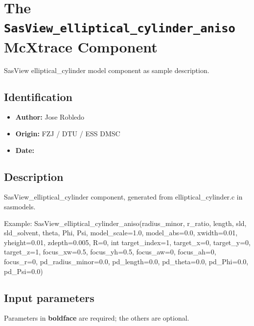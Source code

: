 \section{The \texttt{SasView\_elliptical\_cylinder\_aniso} McXtrace Component}
SasView elliptical\_cylinder model component as sample description.

\subsection*{Identification}
\begin{itemize}
  \item \textbf{Author:} Jose Robledo
  \item \textbf{Origin:} FZJ / DTU / ESS DMSC
  \item \textbf{Date:} 
\end{itemize}

\subsection*{Description}
SasView\_elliptical\_cylinder component, generated from elliptical\_cylinder.c in sasmodels.

Example: SasView\_elliptical\_cylinder\_aniso(radius\_minor, r\_ratio, length, sld, sld\_solvent, theta, Phi, Psi, model\_scale=1.0, model\_abs=0.0, xwidth=0.01, yheight=0.01, zdepth=0.005, R=0, int target\_index=1, target\_x=0, target\_y=0, target\_z=1, focus\_xw=0.5, focus\_yh=0.5, focus\_aw=0, focus\_ah=0, focus\_r=0, pd\_radius\_minor=0.0, pd\_length=0.0, pd\_theta=0.0, pd\_Phi=0.0, pd\_Psi=0.0)

\subsection*{Input parameters}
Parameters in \textbf{boldface} are required; the others are optional.

